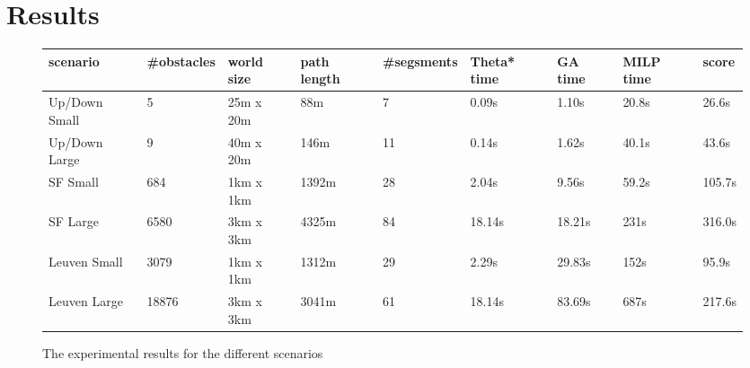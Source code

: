 \section{Results}
\begin{figure}
\begin{tabular}{ l l l l l l l l l }
 scenario & \#obstacles & world size & path length & \#segsments & Theta* time & GA time & MILP time & score \\ 
 \hline
Up/Down Small & 5 &  25m x 20m & 88m  & 7 & 0.09s & 1.10s & 20.8s & 26.6s\\
Up/Down Large & 9 & 40m x 20m &  146m & 11 & 0.14s & 1.62s & 40.1s & 43.6s \\
SF Small & 684 & 1km x 1km & 1392m & 28 & 2.04s & 9.56s & 59.2s & 105.7s \\
SF Large & 6580 & 3km x 3km & 4325m  & 84 & 18.14s & 18.21s & 231s & 316.0s\\
Leuven Small & 3079 & 1km x 1km & 1312m & 29 &  2.29s & 29.83s & 152s  & 95.9s \\
Leuven Large & 18876 & 3km x 3km & 3041m & 61 & 18.14s & 83.69s & 687s & 217.6s \\

\end{tabular}
\caption{The experimental results for the different scenarios}
\label{table:results}
\end{figure}

